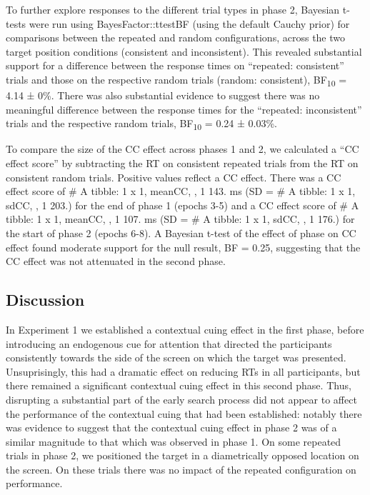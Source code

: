 \documentclass[
  man,
  floatsintext,
  longtable,
  nolmodern,
  notxfonts,
  notimes,
  colorlinks=true,linkcolor=blue,citecolor=blue,urlcolor=blue]{apa7}
\begin{document}
To further explore responses to the different trial types in phase 2,
Bayesian t-tests were run using BayesFactor::ttestBF (using the default
Cauchy prior) for comparisons between the repeated and random
configurations, across the two target position conditions (consistent
and inconsistent). This revealed substantial support for a difference
between the response times on ``repeated: consistent'' trials and those
on the respective random trials (random: consistent),
BF\textsubscript{10} = 4.14 ± 0\%. There was also substantial evidence
to suggest there was no meaningful difference between the response times
for the ``repeated: inconsistent'' trials and the respective random
trials, BF\textsubscript{10} = 0.24 ± 0.03\%.

To compare the size of the CC effect across phases 1 and 2, we
calculated a ``CC effect score'' by subtracting the RT on consistent
repeated trials from the RT on consistent random trials. Positive values
reflect a CC effect. There was a CC effect score of \# A tibble: 1 x 1,
meanCC, , 1 143. ms (SD = \# A tibble: 1 x 1, sdCC, , 1 203.) for the
end of phase 1 (epochs 3-5) and a CC effect score of \# A tibble: 1 x 1,
meanCC, , 1 107. ms (SD = \# A tibble: 1 x 1, sdCC, , 1 176.) for the
start of phase 2 (epochs 6-8). A Bayesian t-test of the effect of phase
on CC effect found moderate support for the null result, BF = 0.25,
suggesting that the CC effect was not attenuated in the second phase.

\subsection{Discussion}\label{discussion}

In Experiment 1 we established a contextual cuing effect in the first
phase, before introducing an endogenous cue for attention that directed
the participants consistently towards the side of the screen on which
the target was presented. Unsuprisingly, this had a dramatic effect on
reducing RTs in all participants, but there remained a significant
contextual cuing effect in this second phase. Thus, disrupting a
substantial part of the early search process did not appear to affect
the performance of the contextual cuing that had been established:
notably there was evidence to suggest that the contextual cuing effect
in phase 2 was of a similar magnitude to that which was observed in
phase 1. On some repeated trials in phase 2, we positioned the target in
a diametrically opposed location on the screen. On these trials there
was no impact of the repeated configuration on performance.
\end{document}
